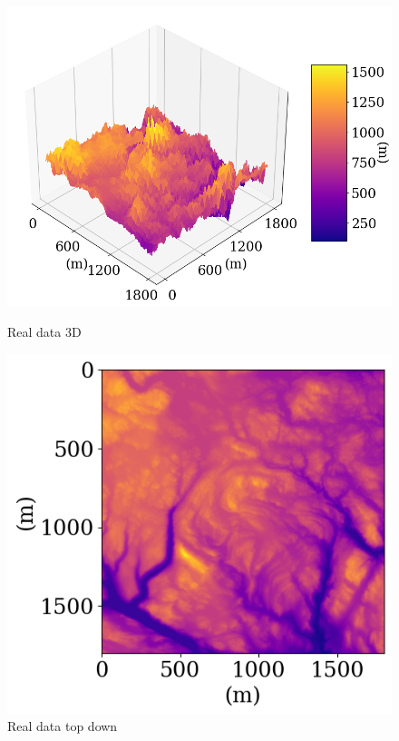 \documentclass[twoside,11pt]{report}
\begin{document}
\begin{figure}[h]
\begin{minipage}[t]{.48\linewidth}
    \begin{center}
        \includegraphics[width=1.0\textwidth]{../runsAndAdditions/realdata3D.png}
        \caption{Real data 3D}\label{fig:realdata3D}
\end{center}
\end{minipage}
\hspace{2mm}
\begin{minipage}[t]{.48\linewidth}
    \begin{center}
        \includegraphics[width=1.0\textwidth]{../runsAndAdditions/realdataMap.png}
        \caption{Real data top down}\label{fig:realdataMap}
    \end{center}
\end{minipage}
\end{figure}
\end{document}
